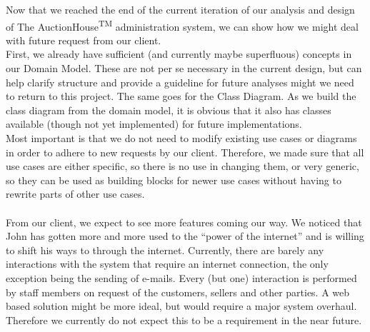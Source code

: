 Now that we reached the end of the current iteration of our analysis and design of The AuctionHouse\textsuperscript{TM} administration system, we can show how we might deal with future request from our client.\\
First, we already have sufficient (and currently maybe superfluous) concepts in our Domain Model. These are not per se necessary in the current design, but can help clarify structure and provide a guideline for future analyses might we need to return to this project. The same goes for the Class Diagram. As we build the class diagram from the domain model, it is obvious that it also has classes available (though not yet implemented) for future implementations.\\
Most important is that we do not need to modify existing use cases or diagrams in order to adhere to new requests by our client. Therefore, we made sure that all use cases are either specific, so there is no use in changing them, or very generic, so they can be used as building blocks for newer use cases without having to rewrite parts of other use cases.\\\\
From our client, we expect to see more features coming our way. We noticed that John has gotten more and more used to the ``power of the internet'' and is willing to shift his ways to through the internet. Currently, there are barely any interactions with the system that require an internet connection, the only exception being the sending of e-mails. Every (but one) interaction is performed by staff members on request of the customers, sellers and other parties. A web based solution might be more ideal, but would require a major system overhaul. Therefore we currently do not expect this to be a requirement in the near future.